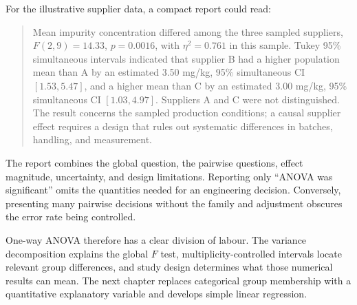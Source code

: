 For the illustrative supplier data, a compact report could read:

\begin{quote}
Mean impurity concentration differed among the three sampled suppliers, $F(2,9)=14.33$, $p=0.0016$, with $\eta^2=0.761$ in this sample. Tukey 95\% simultaneous intervals indicated that supplier B had a higher population mean than A by an estimated 3.50 mg/kg, 95\% simultaneous CI $[1.53,5.47]$, and a higher mean than C by an estimated 3.00 mg/kg, 95\% simultaneous CI $[1.03,4.97]$. Suppliers A and C were not distinguished. The result concerns the sampled production conditions; a causal supplier effect requires a design that rules out systematic differences in batches, handling, and measurement.
\end{quote}

The report combines the global question, the pairwise questions, effect magnitude, uncertainty, and design limitations. Reporting only ``ANOVA was significant'' omits the quantities needed for an engineering decision. Conversely, presenting many pairwise decisions without the family and adjustment obscures the error rate being controlled.

One-way ANOVA therefore has a clear division of labour. The variance decomposition explains the global $F$ test, multiplicity-controlled intervals locate relevant group differences, and study design determines what those numerical results can mean. The next chapter replaces categorical group membership with a quantitative explanatory variable and develops simple linear regression.

